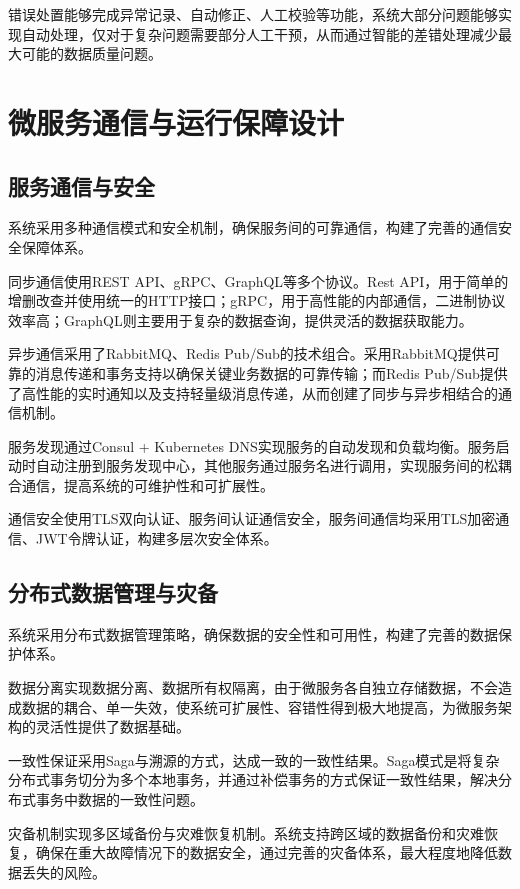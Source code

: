 错误处置能够完成异常记录、自动修正、人工校验等功能，系统大部分问题能够实现自动处理，仅对于复杂问题需要部分人工干预，从而通过智能的差错处理减少最大可能的数据质量问题。

\section{微服务通信与运行保障设计}

\subsection{服务通信与安全}

系统采用多种通信模式和安全机制，确保服务间的可靠通信，构建了完善的通信安全保障体系。

同步通信使用REST API、gRPC、GraphQL等多个协议。Rest API，用于简单的增删改查并使用统一的HTTP接口；gRPC，用于高性能的内部通信，二进制协议效率高；GraphQL则主要用于复杂的数据查询，提供灵活的数据获取能力。

异步通信采用了RabbitMQ、Redis Pub/Sub的技术组合。采用RabbitMQ提供可靠的消息传递和事务支持以确保关键业务数据的可靠传输；而Redis Pub/Sub提供了高性能的实时通知以及支持轻量级消息传递，从而创建了同步与异步相结合的通信机制。

服务发现通过Consul + Kubernetes DNS实现服务的自动发现和负载均衡。服务启动时自动注册到服务发现中心，其他服务通过服务名进行调用，实现服务间的松耦合通信，提高系统的可维护性和可扩展性。

通信安全使用TLS双向认证、服务间认证通信安全，服务间通信均采用TLS加密通信、JWT令牌认证，构建多层次安全体系。

\subsection{分布式数据管理与灾备}

系统采用分布式数据管理策略，确保数据的安全性和可用性，构建了完善的数据保护体系。

数据分离实现数据分离、数据所有权隔离，由于微服务各自独立存储数据，不会造成数据的耦合、单一失效，使系统可扩展性、容错性得到极大地提高，为微服务架构的灵活性提供了数据基础。

一致性保证采用Saga与溯源的方式，达成一致的一致性结果。Saga模式是将复杂分布式事务切分为多个本地事务，并通过补偿事务的方式保证一致性结果，解决分布式事务中数据的一致性问题。

灾备机制实现多区域备份与灾难恢复机制。系统支持跨区域的数据备份和灾难恢复，确保在重大故障情况下的数据安全，通过完善的灾备体系，最大程度地降低数据丢失的风险。

